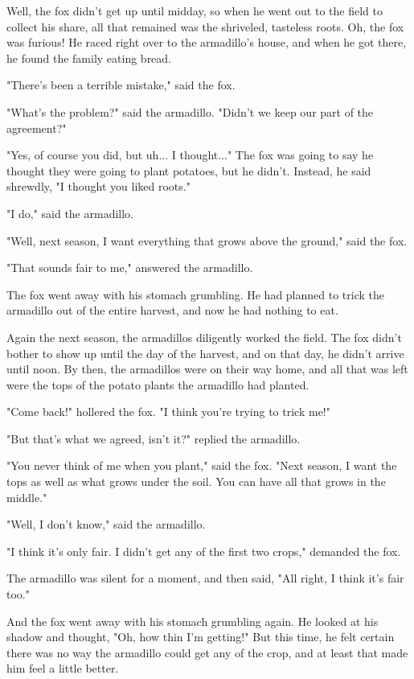 Well, the fox didn't get up until midday, so when he went out to the field to collect his share, all that remained was the shriveled, tasteless roots. Oh, the fox was furious! He raced right over to the armadillo's house, and when he got there, he found the family eating bread.

"There's been a terrible mistake," said the fox.

"What's the problem?" said the armadillo. "Didn't we keep our part of the agreement?"

"Yes, of course you did, but uh... I thought..." The fox was going to say he thought they were going to plant potatoes, but he didn't. Instead, he said shrewdly, "I thought you liked roots."

"I do," said the armadillo.

"Well, next season, I want everything that grows above the ground," said the fox.

"That sounds fair to me," answered the armadillo.

The fox went away with his stomach grumbling. He had planned to trick the armadillo out of the entire harvest, and now he had nothing to eat.

Again the next season, the armadillos diligently worked the field. The fox didn't bother to show up until the day of the harvest, and on that day, he didn't arrive until noon. By then, the armadillos were on their way home, and all that was left were the tops of the potato plants the armadillo had planted.

"Come back!" hollered the fox. "I think you're trying to trick me!"

"But that's what we agreed, isn't it?" replied the armadillo.

"You never think of me when you plant," said the fox. "Next season, I want the tops as well as what grows under the soil. You can have all that grows in the middle."

"Well, I don't know," said the armadillo.

"I think it's only fair. I didn't get any of the first two crops," demanded the fox.

The armadillo was silent for a moment, and then said, "All right, I think it's fair too."

And the fox went away with his stomach grumbling again. He looked at his shadow and thought, "Oh, how thin I'm getting!" But this time, he felt certain there was no way the armadillo could get any of the crop, and at least that made him feel a little better.

